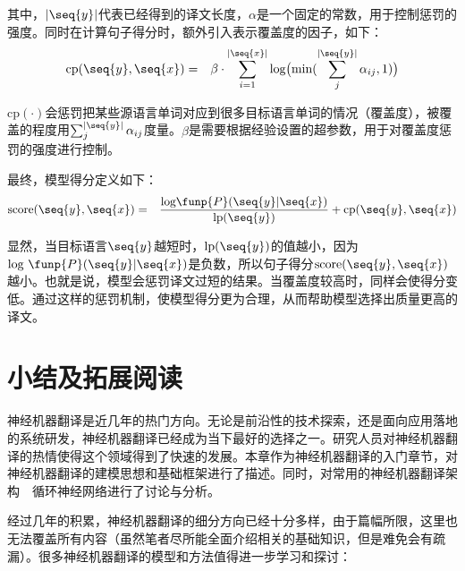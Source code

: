 \noindent 其中，$|\seq{{y}}|$代表已经得到的译文长度，$\alpha$是一个固定的常数，用于控制惩罚的强度。同时在计算句子得分时，额外引入表示覆盖度的因子，如下：
\begin{eqnarray}
\textrm{cp}(\seq{{y}} , \seq{{x}}) &=& \beta \cdot \sum_{i=1}^{|\seq{{x}}|} \textrm{log} \big(\textrm{min}(\sum_j^{|\seq{{y}}|} \alpha_{ij},1 ) \big)
\label{eq:10-34}
\end{eqnarray}

\noindent $\textrm{cp}(\cdot)$会惩罚把某些源语言单词对应到很多目标语言单词的情况（覆盖度），被覆盖的程度用$\sum_j^{|\seq{{y}}|} \alpha_{ij}$度量。$\beta$是需要根据经验设置的超参数，用于对覆盖度惩罚的强度进行控制。

\parinterval 最终，模型得分定义如下：
\begin{eqnarray}
\textrm{score} ( \seq{{y}} , \seq{{x}}) &=& \frac{\textrm{log} \funp{P}(\seq{{y}} | \seq{{x}})} {\textrm{lp}(\seq{{y}})} + \textrm{cp}(\seq{{y}} , \seq{{x}})
\label{eq:10-35}
\end{eqnarray}

\noindent 显然，当目标语言$\seq{{y}}$越短时，$\textrm{lp}(\seq{{y}})$的值越小，因为$\textrm{log } \funp{P}(\seq{{y}} | \seq{{x}})$是负数，所以句子得分$\textrm{score} ( \seq{{y}} , \seq{{x}})$越小。也就是说，模型会惩罚译文过短的结果。当覆盖度较高时，同样会使得分变低。通过这样的惩罚机制，使模型得分更为合理，从而帮助模型选择出质量更高的译文。

\sectionnewpage
\section{小结及拓展阅读}

\parinterval 神经机器翻译是近几年的热门方向。无论是前沿性的技术探索，还是面向应用落地的系统研发，神经机器翻译已经成为当下最好的选择之一。研究人员对神经机器翻译的热情使得这个领域得到了快速的发展。本章作为神经机器翻译的入门章节，对神经机器翻译的建模思想和基础框架进行了描述。同时，对常用的神经机器翻译架构\ \dash \ 循环神经网络进行了讨论与分析。

\parinterval 经过几年的积累，神经机器翻译的细分方向已经十分多样，由于篇幅所限，这里也无法覆盖所有内容（虽然笔者尽所能全面介绍相关的基础知识，但是难免会有疏漏）。很多神经机器翻译的模型和方法值得进一步学习和探讨：

